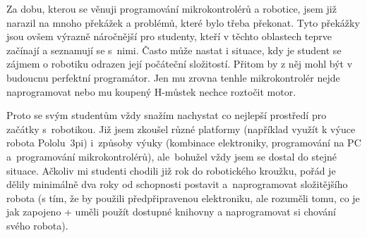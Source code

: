 Za dobu, kterou se věnuji programování mikrokontrolérů a robotice, jsem již narazil na mnoho překážek a problémů, které bylo třeba překonat. 
Tyto překážky jsou ovšem výrazně náročnější pro studenty, kteří v těchto oblastech teprve začínají a seznamují se s~nimi. 
% 
% 
%
%
%
%
Často může nastat i situace, kdy je student se zájmem o robotiku odrazen její počáteční složitostí.
% 
% 
%
%
Přitom by z něj mohl být v budoucnu perfektní programátor. 
Jen mu zrovna tenhle mikrokontrolér nejde naprogramovat nebo mu koupený H-můstek nechce roztočit motor.

Proto se svým studentům vždy snažím nachystat co nejlepší prostředí pro začátky s~robotikou. 
% 
% 
%
%
Již jsem zkoušel různé platformy (například využít k výuce robota Pololu~3pi) i~způsoby výuky (kombinace elektroniky, programování na PC a~programování mikrokontrolérů), ale~bohužel vždy jsem se dostal do stejné situace. 
% 
% 
%
%
Ačkoliv mi studenti chodili již rok do robotického kroužku, pořád je dělily minimálně dva roky od schopnosti postavit a~naprogramovat složitějšího robota (s tím, že by použili předpřipravenou elektroniku, ale rozuměli tomu, co je jak zapojeno + uměli použít dostupné knihovny a naprogramovat si chování svého robota).
% 
% 
%
%

